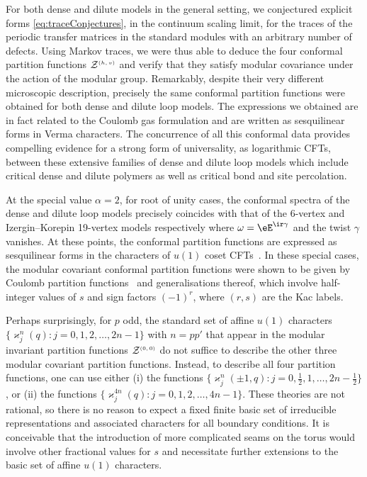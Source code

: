 \documentclass[11pt]{article}
\numberwithin{equation}{section}
\theoremstyle{definition}
\numberwithin{equation}{section}
\begin{document}
For both dense and dilute models in the general setting, we conjectured explicit forms \eqref{eq:traceConjectures}, in the continuum scaling limit, for the traces of the periodic transfer matrices in the standard modules with an arbitrary number of defects. 
Using Markov traces, we were thus able to deduce the four conformal partition functions $\mathcal Z^{\textrm{\tiny$(h,v)$}}$ and verify that they satisfy modular covariance under the action of the modular group.
Remarkably, despite their very different microscopic description, precisely the same conformal partition functions were obtained for both dense and dilute loop models. The expressions we obtained are in fact related to the Coulomb gas formulation and are written as sesquilinear forms in Verma characters. 
The concurrence of all this conformal data provides compelling evidence for a strong form of universality, as logarithmic CFTs, between these extensive families of dense and dilute loop models which include critical dense and dilute polymers as well as critical bond and site percolation.

At the special value $\alpha=2$, for root of unity cases, the conformal spectra of the dense and dilute loop models precisely coincides with that of the 6-vertex and Izergin--Korepin 19-vertex models respectively where $\omega=\eE^{\ir\gamma}$ and the twist $\gamma$ vanishes. At these points, the conformal partition functions are expressed as sesquilinear forms in the characters of $u(1)$ coset CFTs~\cite{PR2011}. In these special cases, the modular covariant conformal partition functions were shown to be given by Coulomb partition functions~\cite{FSZ87npb,FSZ87} and generalisations thereof, which involve half-integer values of $s$ and sign factors $(-1)^r$, where $(r,s)$ are the Kac labels. 

Perhaps surprisingly, {for $p$ odd,} the standard set of affine $u(1)$ characters $\{\varkappa^n_j(q)\!: j=0,1,2,\ldots,2n-1\}$ with $n=pp'$ that appear in the modular invariant partition functions $\mathcal Z^{\textrm{\tiny$(0,0)$}}$ do not suffice to describe the other three modular covariant partition functions. Instead, to describe all four partition functions, one can use either (i) the functions $\{\varkappa^n_j(\pm 1,q): j=0,\frac12,1, \dots, 2n-\frac12\}$, or (ii) the functions $\{\varkappa^{4n}_j(q): j=0,1,2,\ldots,4n-1\}$. 
These theories are not rational, so there is no reason to expect a fixed finite basic set of irreducible representations and associated characters for all boundary conditions. It is conceivable that the introduction of more complicated seams on the torus would involve other fractional values for $s$ and necessitate further extensions to the basic set of affine $u(1)$ characters.
\end{document}
